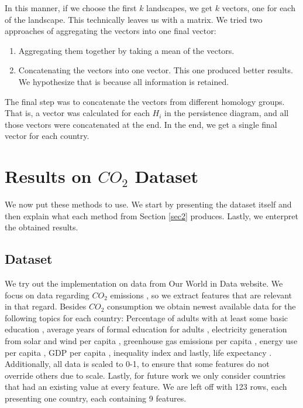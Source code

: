 \documentclass{article}
\begin{document}
In this manner, if we choose the first $k$ landscapes, we get $k$ vectors, one for each of the landscape. This technically leaves us with a matrix. We tried two approaches of aggregating the vectors into one final vector:

\begin{enumerate}
    \item Aggregating them together by taking a mean of the vectors.
    \item Concatenating the vectors into one vector. This one produced better results. We hypothesize that is because all information is retained.
\end{enumerate}

The final step was to concatenate the vectors from different homology groups. That is, a vector was calculated for each $H_i$ in the persistence diagram, and all those vectors were concatenated at the end. In the end, we get a single final vector for each country.

\section{Results on $CO_2$ Dataset}

We now put these methods to use. 
We start by presenting the dataset itself and then explain what each method from Section \ref{sec2} produces.
Lastly, we enterpret the obtained results.

\subsection{Dataset}

We try out the implementation on data from Our World in Data website. 
We focus on data regarding $CO_2$ emissions \cite{owid-co2-and-greenhouse-gas-emissions}, so we extract features that are relevant in that regard.
Besides $CO_2$ consumption we obtain newest available data for the following topics for each country:
Percentage of adults with at least some basic education \cite{ritchie2023education}, average years of formal education for adults \cite{ritchie2023schooling}, electricity generation from solar and wind per capita \cite{ritchie2023solarwind}, greenhouse gas emissions per capita \cite{ritchie2023emissions}, energy use per capita \cite{ritchie2023energy}, GDP per capita \cite{roser2023gdp}, inequality index \cite{owid-economic-inequality} and lastly, life expectancy \cite{owid-life-expectancy}.
Additionally, all data is scaled to 0-1, to ensure that some features do not override others due to scale.
Lastly, for future work we only consider countries that had an existing value at every feature.
We are left off with 123 rows, each presenting one country, each containing 9 features.
\end{document}
